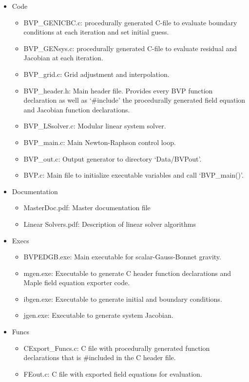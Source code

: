 \documentclass{article}
\begin{document}
\begin{itemize}
\item Code
\begin{itemize}
\item BVP\_GENICBC.c: procedurally generated C-file to evaluate boundary conditions at each iteration and set initial guess.
\item BVP\_GENsys.c: procedurally generated C-file to evaluate residual and Jacobian at each iteration.
\item BVP\_grid.c: Grid adjustment and interpolation.
\item BVP\_header.h: Main header file. Provides every BVP function declaration as well as `\#include' the procedurally generated field equation and Jacobian function declarations.
\item BVP\_LSsolver.c: Modular linear system solver.
\item BVP\_main.c: Main Newton-Raphson control loop.
\item BVP\_out.c: Output generator to directory `Data/BVPout'.
\item BVP.c: Main file to initialize executable variables and call `BVP\_main()'.
\end{itemize}
\item Documentation
\begin{itemize}
\item MasterDoc.pdf: Master documentation file
\item Linear Solvers.pdf: Description of linear solver algorithms
\end{itemize}
\item Execs
\begin{itemize}
\item BVPEDGB.exe: Main executable for scalar-Gauss-Bonnet gravity.
\item mgen.exe: Executable to generate C header function declarations and Maple field equation exporter code.
\item ibgen.exe: Executable to generate initial and boundary conditions.
\item jgen.exe: Executable to generate system Jacobian.
\end{itemize}
\item Funcs
\begin{itemize}
\item CExport\_Funcs.c: C file with procedurally generated function declarations that is \#included in the C header file.
\item FEout.c: C file with exported field equations for evaluation.

\end{itemize}
\end{itemize}
\end{document}
